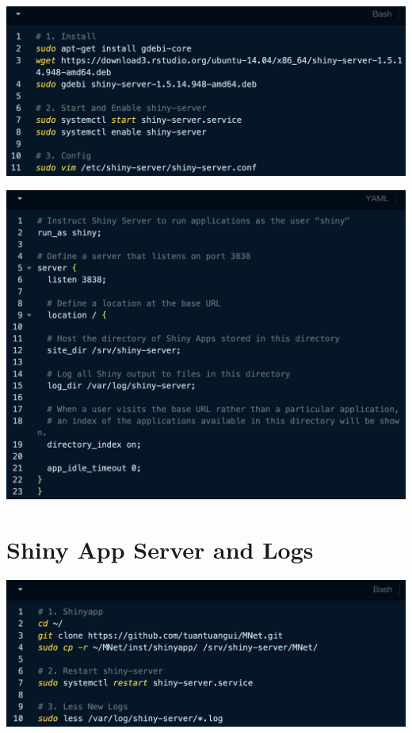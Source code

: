\documentclass[
]{book}
\begin{document}
\begin{center}\includegraphics[width=24.75in]{figure/3.3.1} \end{center}

\begin{center}\includegraphics[width=25.06in]{figure/3.3.2} \end{center}

\section{Shiny App Server and Logs}\label{shiny-app-server-and-logs}

\begin{center}\includegraphics[width=24.86in]{figure/3.4.1} \end{center}
\end{document}
